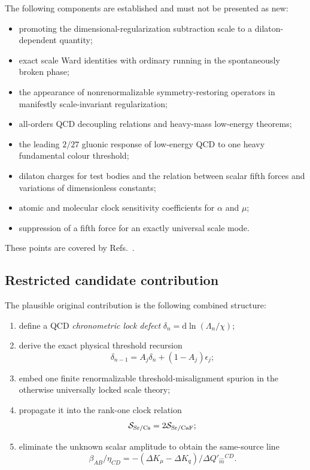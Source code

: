 \documentclass[11pt,a4paper]{article}
\newcommand{\dd}{\mathrm{d}}
\begin{document}
The following components are established and must not be presented as new:

\begin{itemize}
  \item promoting the dimensional-regularization subtraction scale to a dilaton-dependent quantity;
  \item exact scale Ward identities with ordinary running in the spontaneously broken phase;
  \item the appearance of nonrenormalizable symmetry-restoring operators in manifestly scale-invariant regularization;
  \item all-orders QCD decoupling relations and heavy-mass low-energy theorems;
  \item the leading $2/27$ gluonic response of low-energy QCD to one heavy fundamental colour threshold;
  \item dilaton charges for test bodies and the relation between scalar fifth forces and variations of dimensionless constants;
  \item atomic and molecular clock sensitivity coefficients for $\alpha$ and $\mu$;
  \item suppression of a fifth force for an exactly universal scale mode.
\end{itemize}

These points are covered by Refs.~\cite{Tamarit2013,Ghilencea2016,HerreroValea2020,Chetyrkin1998,DamourDonoghue2010,Brzeminski2022,Elder2025,Ferreira2017}.

\subsection{Restricted candidate contribution}

The plausible original contribution is the following combined structure:

\begin{enumerate}
  \item define a QCD \emph{chronometric lock defect} $\delta_n=\dd\ln(\Lambda_n/\chi)$;
  \item derive the exact physical threshold recursion
  \[
  \delta_{n-1}=A_j\delta_n+(1-A_j)\epsilon_j;
  \]
  \item embed one finite renormalizable threshold-misalignment spurion in the otherwise universally locked scale theory;
  \item propagate it into the rank-one clock relation
  \[
  \mathcal S_{\rm Sr/Cs}=2\mathcal S_{\rm Sr/CaF};
  \]
  \item eliminate the unknown scalar amplitude to obtain the same-source line
  \[
  \beta_{AB}/\eta_{CD}
  =-(\Delta K_\mu-\Delta K_q)/\Delta Q'_{\widehat m}{}^{CD}.
  \]
\end{enumerate}
\end{document}
